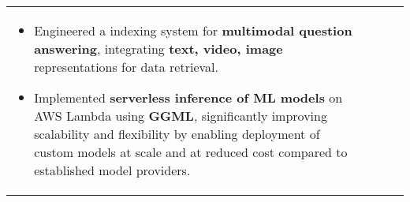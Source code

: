 \documentclass[10pt,a4]{article}
\begin{document}
{\begin{tabu}
\begin{center}
\begin{tabular} {p{} p{} p{} p{}}
\begin{flushleft}
\begin{itemize}
        \item Engineered a indexing system for \textbf{multimodal question answering}, integrating \textbf{text, video, image} representations for data retrieval.
        \item Implemented \textbf{serverless inference of ML models} on AWS Lambda using \textbf{GGML}, significantly improving scalability and flexibility by enabling deployment of custom models at scale and at reduced cost compared to established model providers.

    \end{itemize}	
    

\end{flushleft}
\end{tabular}
\end{center}
\end{tabu}}
\end{document}
